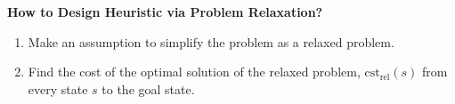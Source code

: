 \begin{process} \textbf{How to Design Heuristic via Problem Relaxation?}
    \begin{enumerate}
        \item Make an assumption to simplify the problem as a relaxed problem. 
        \item Find the cost of the optimal solution of the relaxed problem, $\text{cst}_{\text{rel}}(s)$ from every state $s$ to the goal state.
    \end{enumerate}
\end{process}

\begin{example}
\end{example}








